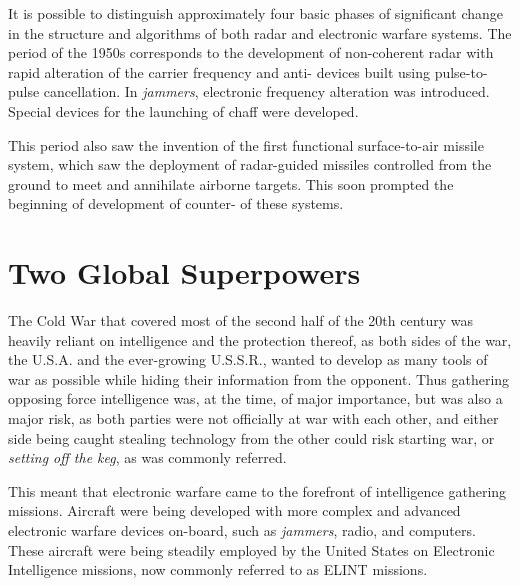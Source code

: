 \documentclass[english,purist]{ist-report}
\begin{document}
It is possible to distinguish approximately four basic phases of significant change in the structure and algorithms of both radar and electronic warfare systems. The period of the 1950s corresponds to the development of non-coherent radar with rapid alteration of the carrier frequency and anti-\jamming{} devices built using pulse-to-pulse cancellation. In \textit{jammers}, electronic frequency alteration was introduced. Special devices for the launching of chaff were developed.

This period also saw the invention of the first functional surface-to-air missile system, which saw the deployment of radar-guided missiles controlled from the ground to meet and annihilate airborne targets. This soon prompted the beginning of development of counter-\jamming{} of these systems.

\section{Two Global Superpowers}

The Cold War that covered most of the second half of the 20th century was heavily reliant on intelligence and the protection thereof, as both sides of the war, the U.S.A. and the ever-growing U.S.S.R., wanted to develop as many tools of war as possible while hiding their information from the opponent. Thus gathering opposing force intelligence was, at the time, of major importance, but was also a major risk, as both parties were not officially at war with each other, and either side being caught stealing technology from the other could risk starting war, or \textit{setting off the keg}, as was commonly referred.

This meant that electronic warfare came to the forefront of intelligence gathering missions. Aircraft were being developed with more complex and advanced electronic warfare devices on-board, such as \textit{jammers}, radio, and computers. These aircraft were being steadily employed by the United States on Electronic Intelligence missions, now commonly referred to as ELINT missions.
\end{document}
